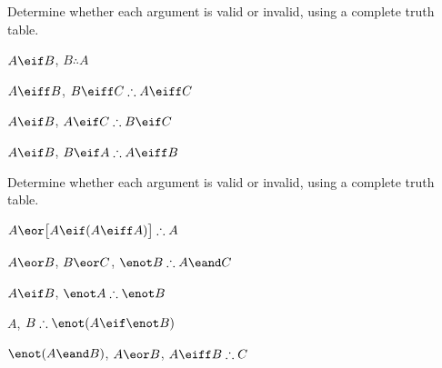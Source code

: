 \noindent\problempart
\label{pr.TT.valid2}
Determine whether each argument is valid or invalid, using a complete truth table.
\begin{compactlist}
\item $A\eif B$, $B \therefore  A$ %

\item $A\eiff B$, $B\eiff C \therefore A\eiff C$ %

\item $A \eif B$, $A \eif C\therefore B \eif C$ %

\item $A \eif B$, $B \eif A\therefore A \eiff B$ %

\end{compactlist}

\noindent\problempart
\label{pr.TT.valid3}
Determine whether each argument is valid or invalid, using a complete truth table.
\begin{compactlist}
\item $A\eor\bigl[A\eif(A\eiff A)\bigr] \therefore  A $\vspace{.5ex}%
\item $A\eor B$, $B\eor C$, $\enot B \therefore A \eand C$\vspace{.5ex} %
\item $A \eif B$, $\enot A\therefore \enot B$ \vspace{.5ex}%
\item $A$, $B\therefore \enot(A\eif \enot B)$ \vspace{.5ex}%
\item $\enot(A \eand B)$, $A \eor B$, $A \eiff B\therefore C$ \vspace{.5ex}%
\end{compactlist}

